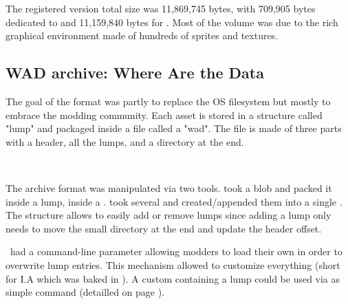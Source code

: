 %   
\vspace{2mm}
\pagebreak
The registered version total size was 11,869,745 bytes, with 709,905 bytes dedicated to  and 11,159,840 bytes for . Most of the volume was due to the rich graphical environment made of hundreds of sprites and textures.\\
\par


\par
{}
%  




\subsection{WAD archive: Where Are the Data}
\label{wad_explained}
The goal of the  format was partly to replace the OS filesystem but mostly to embrace the modding community. Each asset is stored in a structure called "lump" and packaged inside a file called a "wad". The file is made of three parts with a header, all the lumps, and a directory at the end.\\

\par
{}
\par
{}\\
\par
{}
\par
The archive format was manipulated via two tools.  took a blob and packed it inside a lump, inside a .  took several  and created/appended them into a single . The structure allows to easily add or remove lumps since adding a lump only needs to move the small directory at the end and update the header offset.\\
\par
\doom~had a command-line parameter allowing modders to load their own  in order to overwrite  lump entries. This mechanism allowed to customize everything (short for I.A which was baked in ). A custom  containing a  lump could be used via as simple  command (detailled on page \pageref{wad_detailled}).




